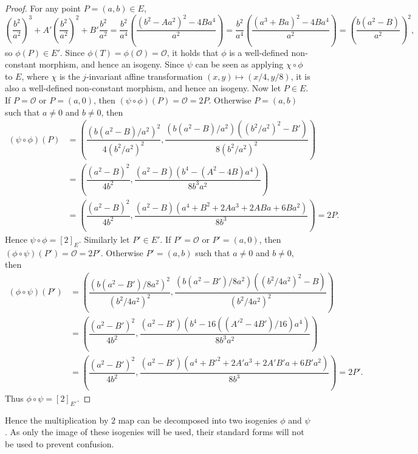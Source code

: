 \documentclass{article}
\newcommand{\rb}[1]{\left( #1 \right)}
\renewcommand{\sb}[1]{\left[ #1 \right]}
\theoremstyle{definition}\newtheorem*{definition}{Definition}
\theoremstyle{definition}\newtheorem*{example}{Example}
\theoremstyle{definition}\newtheorem*{remark}{Remark}
\begin{document}
\begin{proof}
For any point $ P = \rb{a, b} \in E $,
$$ \rb{\dfrac{b^2}{a^2}}^3 + A'\rb{\dfrac{b^2}{a^2}}^2 + B'\dfrac{b^2}{a^2}
= \dfrac{b^2}{a^4}\rb{\dfrac{\rb{b^2 - Aa^2}^2 - 4Ba^4}{a^2}}
= \dfrac{b^2}{a^4}\rb{\dfrac{\rb{a^3 + Ba}^2 - 4Ba^4}{a^2}}
= \rb{\dfrac{b\rb{a^2 - B}}{a^2}}^2, $$
so $ \phi\rb{P} \in E' $. Since $ \phi\rb{T} = \phi\rb{\mathcal{O}} = \mathcal{O} $, it holds that $ \phi $ is a well-defined non-constant morphism, and hence an isogeny. Since $ \psi $ can be seen as applying $ \chi \circ \phi $ to $ E $, where $ \chi $ is the $ j $-invariant affine transformation $ \rb{x, y} \mapsto \rb{x / 4, y / 8} $, it is also a well-defined non-constant morphism, and hence an isogeny. Now let $ P \in E $. If $ P = \mathcal{O} $ or $ P = \rb{a, 0} $, then $ \rb{\psi \circ \phi}\rb{P} = \mathcal{O} = 2P $. Otherwise $ P = \rb{a, b} $ such that $ a \ne 0 $ and $ b \ne 0 $, then
\begin{align*}
\rb{\psi \circ \phi}\rb{P}
& = \rb{\dfrac{\rb{b\rb{a^2 - B} / a^2}^2}{4\rb{b^2 / a^2}^2}, \dfrac{\rb{b\rb{a^2 - B} / a^2}\rb{\rb{b^2 / a^2}^2 - B'}}{8\rb{b^2 / a^2}^2}} \\
& = \rb{\dfrac{\rb{a^2 - B}^2}{4b^2}, \dfrac{\rb{a^2 - B}\rb{b^4 - \rb{A^2 - 4B}a^4}}{8b^3a^2}} \\
& = \rb{\dfrac{\rb{a^2 - B}^2}{4b^2}, \dfrac{\rb{a^2 - B}\rb{a^4 + B^2 + 2Aa^3 + 2ABa + 6Ba^2}}{8b^3}} = 2P.
\end{align*}
Hence $ \psi \circ \phi = \sb{2}_E $. Similarly let $ P' \in E' $. If $ P' = \mathcal{O} $ or $ P' = \rb{a, 0} $, then $ \rb{\phi \circ \psi}\rb{P'} = \mathcal{O} = 2P' $. Otherwise $ P' = \rb{a, b} $ such that $ a \ne 0 $ and $ b \ne 0 $, then
\begin{align*}
\rb{\phi \circ \psi}\rb{P'}
& = \rb{\dfrac{\rb{b\rb{a^2 - B'} / 8a^2}^2}{\rb{b^2 / 4a^2}^2}, \dfrac{\rb{b\rb{a^2 - B'} / 8a^2}\rb{\rb{b^2 / 4a^2}^2 - B}}{\rb{b^2 / 4a^2}^2}} \\
& = \rb{\dfrac{\rb{a^2 - B'}^2}{4b^2}, \dfrac{\rb{a^2 - B'}\rb{b^4 - 16\rb{\rb{A'^2 - 4B'} / 16}a^4}}{8b^3a^2}} \\
& = \rb{\dfrac{\rb{a^2 - B'}^2}{4b^2}, \dfrac{\rb{a^2 - B'}\rb{a^4 + B'^2 + 2A'a^3 + 2A'B'a + 6B'a^2}}{8b^3}} = 2P'.
\end{align*}
Thus $ \phi \circ \psi = \sb{2}_{E'} $.
\end{proof}

Hence the multiplication by $ 2 $ map can be decomposed into two isogenies $ \phi $ and $ \psi $. As only the image of these isogenies will be used, their standard forms will not be used to prevent confusion.
\end{document}
